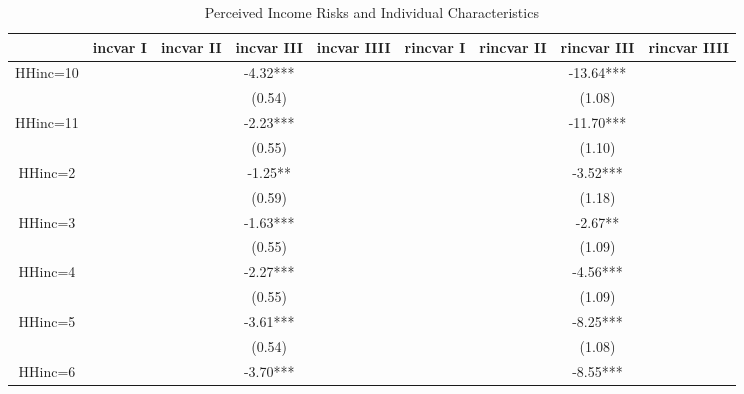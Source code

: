 \documentclass[12pt,notitlepage,onecolumn,aps,pra]{article}
\begin{document}
\begin{table}[ht]
\centering
\begin{adjustbox}{width={0.9\textwidth},totalheight={\textheight}}
\begin{threeparttable}
\caption{Perceived Income Risks and Individual Characteristics}
\label{micro_reg}\begin{tabular}{ccccccccc}
\toprule
{} & incvar I & incvar II & incvar III & incvar IIII & rincvar I & rincvar II & rincvar III & rincvar IIII \\
\midrule
HHinc=10     &          &           &   -4.32*** &             &           &            &   -13.64*** &              \\
             &          &           &     (0.54) &             &           &            &      (1.08) &              \\
HHinc=11     &          &           &   -2.23*** &             &           &            &   -11.70*** &              \\
             &          &           &     (0.55) &             &           &            &      (1.10) &              \\
HHinc=2      &          &           &    -1.25** &             &           &            &    -3.52*** &              \\
             &          &           &     (0.59) &             &           &            &      (1.18) &              \\
HHinc=3      &          &           &   -1.63*** &             &           &            &     -2.67** &              \\
             &          &           &     (0.55) &             &           &            &      (1.09) &              \\
HHinc=4      &          &           &   -2.27*** &             &           &            &    -4.56*** &              \\
             &          &           &     (0.55) &             &           &            &      (1.09) &              \\
HHinc=5      &          &           &   -3.61*** &             &           &            &    -8.25*** &              \\
             &          &           &     (0.54) &             &           &            &      (1.08) &              \\
HHinc=6      &          &           &   -3.70*** &             &           &            &    -8.55*** &              \\

\end{tabular}
\end{threeparttable}
\end{adjustbox}
\end{table}
\end{document}
